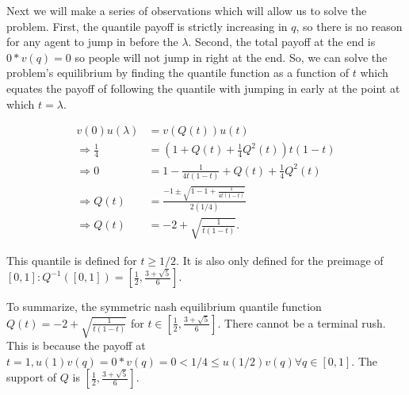 \documentclass[11pt]{article} %
\begin{document}
Next we will make a series of observations which will allow us to solve the problem. First, the quantile payoff is strictly increasing in $q$, so there is no reason for any agent to jump in before the $\lambda$. Second, the total payoff at the end is $0*v(q) = 0$ so people will not jump in right at the end. So, we can solve the problem's equilibrium by finding the quantile function as a function of $t$ which equates the payoff of following the quantile with jumping in early at the point at which $t=\lambda.$

\begin{align*}
v(0)u(\lambda) &= v(Q(t))u(t) \\
\Rightarrow \frac{1}{4} &= \left(1+Q(t) + \frac{1}{4}Q^2(t)\right)t(1-t) \\
\Rightarrow 0 &= 1-\frac{1}{4t(1-t)} + Q(t) + \frac{1}{4}Q^2(t)\\
\Rightarrow Q(t) &= \frac{-1\pm \sqrt{1 - 1 + \frac{1}{4t(1-t)}}}{2(1/4)}\\
\Rightarrow Q(t) &= -2 + \sqrt{\frac{1}{t(1-t)}}.
\end{align*}

This quantile is defined for $t\geq1/2$. It is also only defined for the preimage of $[0,1]: Q^{-1}([0,1]) =  [\frac{1}{2},\frac{3+\sqrt{5}}{6}]$.

To summarize, the symmetric nash equilibrium quantile function $Q(t) =  -2 + \sqrt{\frac{1}{t(1-t)}}$ for $t\in [\frac{1}{2},\frac{3+\sqrt{5}}{6}]$. There cannot be a terminal rush. This is because the payoff at $t=1, u(1)v(q) = 0*v(q) = 0<1/4\leq u(1/2)v(q) \forall q \in [0,1].$ The support of $Q$ is $[\frac{1}{2},\frac{3+\sqrt{5}}{6}].$
\end{document}
